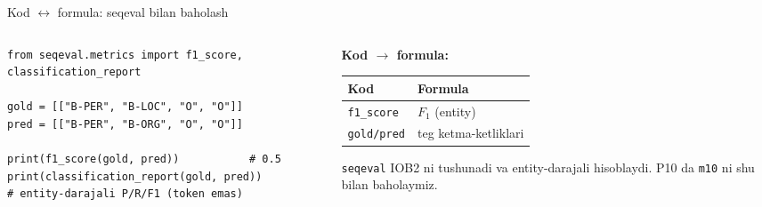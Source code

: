 \documentclass[aspectratio=169,11pt]{beamer}
\begin{document}
\begin{frame}[fragile]{Kod $\leftrightarrow$ formula: seqeval bilan baholash}
  \begin{columns}[T]
    \begin{column}{0.58\textwidth}
\begin{lstlisting}
from seqeval.metrics import f1_score, classification_report

gold = [["B-PER", "B-LOC", "O", "O"]]
pred = [["B-PER", "B-ORG", "O", "O"]]

print(f1_score(gold, pred))           # 0.5
print(classification_report(gold, pred))
# entity-darajali P/R/F1 (token emas)
\end{lstlisting}
    \end{column}
    \begin{column}{0.38\textwidth}
      \textbf{Kod $\to$ formula:}\\[3pt]
      \footnotesize
      \begin{tabular}{p{1.8cm}p{2.0cm}}
        \toprule
        Kod & Formula \\
        \midrule
        \texttt{f1\_score} & $F_1$ (entity) \\
        \texttt{gold/pred} & teg ketma-ketliklari \\
        \bottomrule
      \end{tabular}
      \vspace{4pt}
      \begin{tcolorbox}[okbox,top=2pt,bottom=2pt]
        \footnotesize
        \texttt{seqeval} IOB2 ni tushunadi va entity-darajali hisoblaydi. P10 da
        \texttt{m10} ni shu bilan baholaymiz.
      \end{tcolorbox}
    \end{column}
  \end{columns}
\end{frame}
\end{document}
